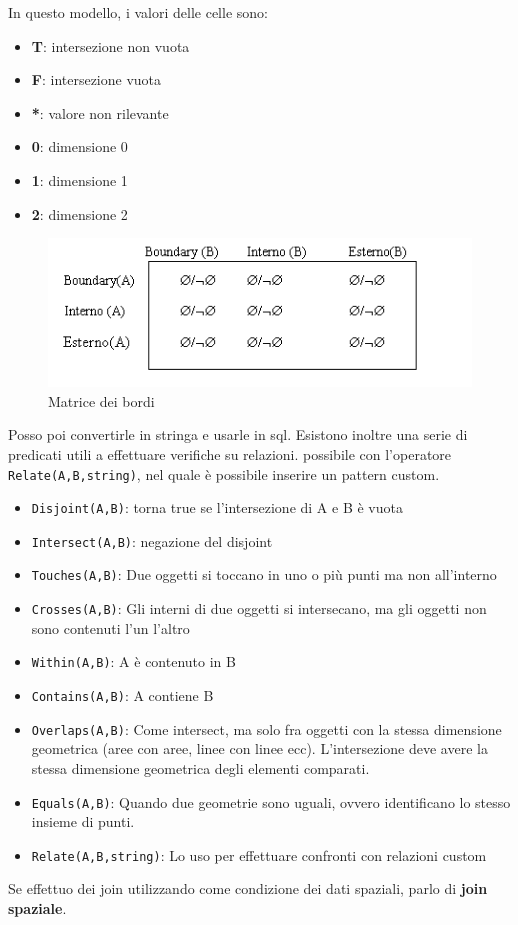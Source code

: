 \documentclass[a4paper,12pt]{article}
\begin{document}
In questo modello, i valori delle celle sono:
\begin{itemize}
\item \textbf{T}: intersezione non vuota
\item \textbf{F}: intersezione vuota
\item \textbf{*}: valore non rilevante
\item \textbf{0}: dimensione 0
\item \textbf{1}: dimensione 1
\item \textbf{2}: dimensione 2
\end{itemize}
\begin{figure}[H]
	\centering
	\includegraphics[width=0.8\linewidth]{Immagini/treTreMat}
	\caption{Matrice dei bordi}
\end{figure}
Posso poi convertirle in stringa e usarle in sql. Esistono inoltre una serie di predicati utili a effettuare verifiche su relazioni. \E possibile con l'operatore \texttt{Relate(A,B,string)}, nel quale è possibile inserire un pattern custom.
\begin{itemize}
\item \texttt{Disjoint(A,B)}: torna true se l'intersezione di A e B è vuota
\item \texttt{Intersect(A,B)}: negazione del disjoint
\item \texttt{Touches(A,B)}: Due oggetti si toccano in uno o più punti ma non all'interno
\item \texttt{Crosses(A,B)}: Gli interni di due oggetti si intersecano, ma gli oggetti non sono contenuti l'un l'altro
\item \texttt{Within(A,B)}: A è contenuto in B
\item \texttt{Contains(A,B)}: A contiene B
\item \texttt{Overlaps(A,B)}: Come intersect, ma solo fra oggetti con la stessa dimensione geometrica (aree con aree, linee con linee ecc). L'intersezione deve avere la stessa dimensione geometrica degli elementi comparati. 
\item \texttt{Equals(A,B)}: Quando due geometrie sono uguali, ovvero identificano lo stesso insieme di punti.
\item \texttt{Relate(A,B,string)}: Lo uso per effettuare confronti con relazioni custom
\end{itemize}

Se effettuo dei join utilizzando come condizione dei dati spaziali, parlo di \textbf{join spaziale}.




\end{document}
